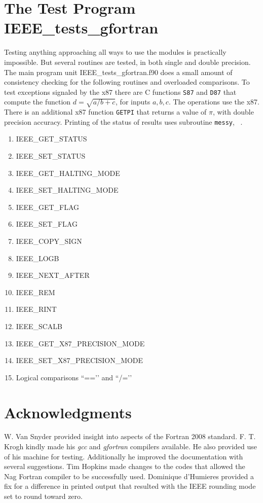 \documentclass[12pt]{article}
\begin{document}
\section{The Test Program IEEE\_tests\_gfortran}
Testing anything approaching all  ways to use the modules is practically impossible.  But several routines are tested, in both single and double precision.  The main program unit  IEEE\_tests\_gfortran.f90 does a small amount of consistency checking for the following routines and overloaded comparisons.  To test exceptions signaled by the x87 there are C functions
{\tt S87} and {\tt D87} that compute the function $d=\sqrt{a/b+c}$, for inputs $a,b,c$.  The operations use the x87. There is an additional x87 function {\tt GETPI} that returns a  value of $\pi$, with double precision accuracy.    Printing of the status of results uses subroutine {\tt messy}, ~\cite{Krogh:2013:MSY}.

\begin{enumerate}
\item IEEE\_GET\_STATUS
\item IEEE\_SET\_STATUS
\item IEEE\_GET\_HALTING\_MODE
\item IEEE\_SET\_HALTING\_MODE
\item IEEE\_GET\_FLAG
\item IEEE\_SET\_FLAG
\item IEEE\_COPY\_SIGN
\item IEEE\_LOGB
\item IEEE\_NEXT\_AFTER
\item IEEE\_REM
\item IEEE\_RINT
\item IEEE\_SCALB
\item IEEE\_GET\_X87\_PRECISION\_MODE
\item IEEE\_SET\_X87\_PRECISION\_MODE
\item Logical comparisons ``==\rq{}\rq{} and ``/=\rq{}\rq{}
\end{enumerate}
\section{Acknowledgments}
W. Van Snyder provided insight into aspects of the Fortran 2008 standard.   F. T. Krogh kindly made his {\it gcc} and {\it gfortran} compilers available.  He also provided use of his machine for testing.  Additionally  he improved the documentation with several suggestions.  Tim Hopkins made changes to the codes that allowed the Nag Fortran compiler to be successfully used.  Dominique d'Humieres provided a fix for a difference in  printed output that resulted  with the  IEEE rounding mode set to round toward zero.

\end{document}
